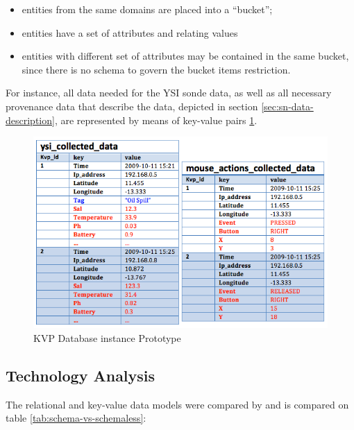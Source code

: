\begin{itemize}
  \item entities from the same domains are placed into a ``bucket'';
  \item entities have a set of attributes and relating values
  \item entities with different set of attributes may be contained in the same
  bucket, since there is no schema to govern the bucket items restriction.
\end{itemize}

For instance, all data needed for the YSI sonde data, as well as all necessary
provenance data that describe the data, depicted in section
\ref{sec:sn-data-description}, are represented by means of key-value pairs
\ref{fig:persistence-example-kvp}.

\begin{figure}[!h]
  \centering
  \includegraphics[scale=0.5]{../diagrams/persistence-example-kvp}
  \caption{KVP Database instance Prototype}
  \label{fig:persistence-example-kvp}
\end{figure}

\subsection{Technology Analysis}

The relational and key-value data models were compared by
\cite{db-is-rdbs-dommed} and is compared on table
\ref{tab:schema-vs-schemaless}:

